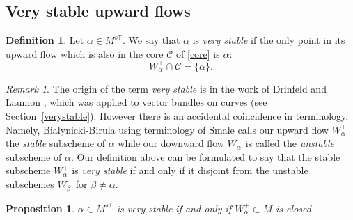 \documentclass[12pt]{article}
\numberwithin{equation}{section}
\newtheorem{proposition}[theorem]{Proposition}
\theoremstyle{remark}
\newtheorem{remark}[theorem]{Remark}
\theoremstyle{definition}
\newtheorem{definition}[theorem]{Definition}
\numberwithin{theorem}{section}
\newcommand{\T}{{\mathbb{T}}}
\def\calC{{\mathcal C}}
\renewcommand{\1}{\mathbbm{1}}
\begin{document}
\subsection{Very stable upward flows}
\begin{definition} Let $\alpha\in M^{s\T}$. We say that $\alpha$ is {\em very stable} if the only point in its upward flow which is also in the core $\calC$ of \eqref{core} is $\alpha$: $$W^+_\alpha\cap \calC=\{\alpha\}.$$ %
\end{definition} 

\begin{remark} The origin of the term {\em very stable} is in the work of Drinfeld \cite{drinfeld} and  Laumon \cite{laumon}, which was applied to vector bundles on curves (see Section~\ref{verystable}). However there is an accidental coincidence in  terminology. Namely, Bialynicki-Birula \cite{bialynicki-birula2} using terminology of Smale \cite[II.2]{smale} calls our upward flow $W^+_\alpha$ the {\em stable} subscheme of $\alpha$ while our downward flow $W^-_\alpha$ is called the {\em unstable} subscheme of $\alpha$. Our definition above can be formulated to say that the stable subscheme $W^+_\alpha$ is {\em very stable} if and only if it disjoint from the unstable subschemes $W^-_\beta$ for $\beta\neq \alpha$. 
\end{remark}
\begin{proposition} \label{upwardclose} $\alpha\in M^{s\T}$ is very stable if and only if $W^+_\alpha\subset M$ is closed. 
\end{proposition}
\end{document}
